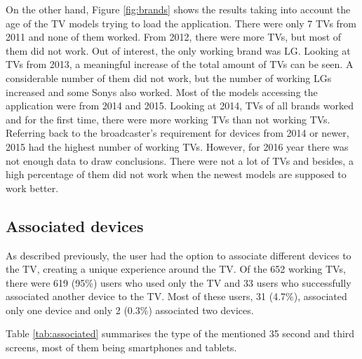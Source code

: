 On the other hand, Figure \ref{fig:brands} shows the results taking into account the age of the TV models trying to load the application. There were only 7 TVs from 2011 and none of them worked. From 2012, there were more TVs, but most of them did not work. Out of interest, the only working brand was LG. Looking at TVs from 2013, a meaningful increase of the total amount of TVs can be seen. A considerable number of them did not work, but the number of working LGs increased and some Sonys also worked. Most of the models accessing the application were from 2014 and 2015. Looking at 2014, TVs of all brands worked and for the first time, there were more working TVs than not working TVs. Referring back to the broadcaster’s requirement for devices from 2014 or newer, 2015 had the highest number of working TVs. However, for 2016 year there was not enough data to draw conclusions. There were not a lot of TVs and besides, a high percentage of them did not work when the newest models are supposed to work better.

\subsection{Associated devices}\label{associatedres}
As described previously, the user had the option to associate different devices to the TV, creating a unique experience around the TV. Of the 652 working TVs, there were 619 (95\%) users who used only the TV and 33 users who successfully associated another device to the TV. Most of these users, 31 (4.7\%), associated only one device and only 2 (0.3\%) associated two devices.


Table \ref{tab:associated} summarises the type of the mentioned 35 second and third screens, most of them being smartphones and tablets.

